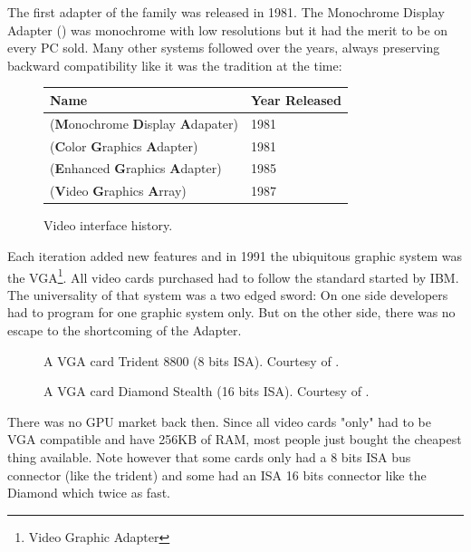 \documentclass[book.tex]{subfiles}
\begin{document}
The first adapter of the family was released in 1981. The Monochrome Display
   Adapter () was monochrome with low resolutions but it had the merit to be on every PC sold. Many other systems followed over the years, always preserving backward compatibility like it was the tradition at the time:
\bigskip
  
 \begin{figure}[H]
\centering  
\begin{tabularx}{\textwidth}{ X  Y }
  \toprule
  \textbf{Name} &  \textbf{Year Released} \\
  \toprule {}
   (\textbf{M}onochrome
   \textbf{D}isplay
   \textbf{A}dapater) & 1981 
   \\ 
   (\textbf{C}olor
   \textbf{G}raphics
   \textbf{A}dapter) & 1981 
    \\ 
   (\textbf{E}nhanced
   \textbf{G}raphics
   \textbf{A}dapter) & 1985
   \\ 
   (\textbf{V}ideo
   \textbf{G}raphics
   \textbf{A}rray)  & 1987
    \\
  \toprule
\end{tabularx}
\caption{Video interface history.}\label{fig:vga_history}
\end{figure}

Each iteration added new features and in 1991 the ubiquitous graphic system was the VGA\footnote{Video Graphic Adapter}. All video cards purchased had to follow the standard started by IBM. The universality of that system was a two edged sword: On one side developers had to program for one graphic system only. But on the other side, there was no escape to the shortcoming of the Adapter.\\

\begin{figure}[H] 
  \centering 
  \caption{A VGA card Trident 8800 (8 bits ISA). Courtesy of .}
\end{figure}
\par
\begin{figure}[H] 
  \centering 
  \caption{A VGA card Diamond Stealth (16 bits ISA). Courtesy of .}
\end{figure}
 There was no GPU market back then. Since all video cards "only" had to be VGA compatible and have 256KB of RAM, most people just bought the cheapest thing available. Note however that some cards only had a 8 bits ISA bus connector (like the trident) and some had an ISA 16 bits connector like the Diamond which twice as fast.\\
\par
\end{document}
